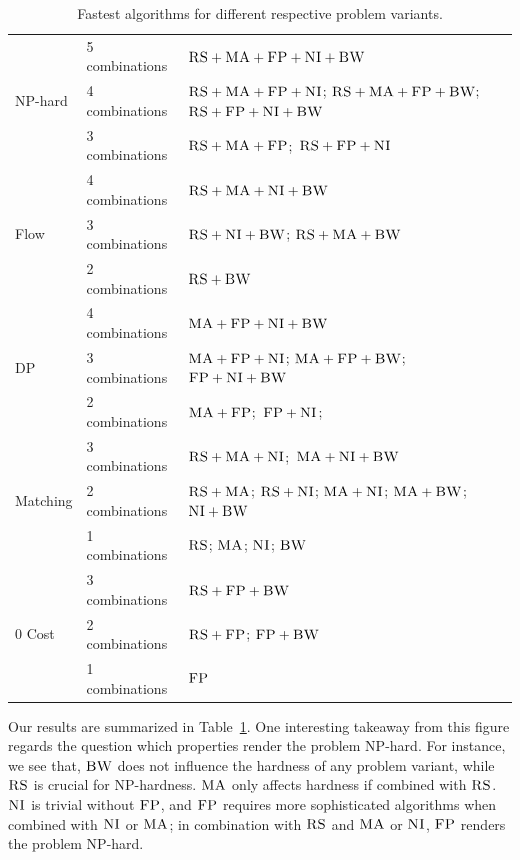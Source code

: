 \documentclass[preprint,12pt]{elsarticle}
\newcommand{\CC}{\textsc{NI}}
\newcommand{\FP}{\textsc{FP}}
\newcommand{\RS}{\textsc{RS}}
\newcommand{\BW}{\textsc{BW}}
\newcommand{\MA}{\textsc{MA}}
\begin{document}
\begin{table}
\tiny
\bgroup
\def\arraystretch{1.5}
\begin{small}
\begin{tabular}{|l|l|p{4.5cm}|}
\hline
\multirow{3}{*}{NP-hard} & 5 combinations & \mbox{$\RS+\MA+\FP+\CC+\BW$}\\
\cline{2-3}
 & 4 combinations &  \mbox{$\RS+\MA+\FP+\CC$}; \mbox{$\RS+\MA+\FP+\BW$};
\mbox{$\RS+\FP+\CC+\BW$} \\ \cline{2-3}
 & 3 combinations &\mbox{$\RS+\MA+\FP$};~\mbox{$\RS+\FP+\CC$} \\
 \hline
 \hline
\multirow{3}{*}{Flow} & 4 combinations & \mbox{$\RS+\MA+\CC+\BW$} \\ \cline{2-3}
 & 3 combinations & \mbox{$\RS+\CC+\BW$}; \mbox{$\RS+\MA+\BW$}    \\ \cline{2-3}
 & 2 combinations &$\RS+\BW$ \\
 \hline
 \hline
\multirow{3}{*}{DP} & 4 combinations & \mbox{$\MA+\FP+\CC+\BW$} \\ \cline{2-3}
 & 3 combinations &   \mbox{$\MA+\FP+\CC$};
\mbox{$\MA+\FP+\BW$}; \mbox{$\FP+\CC+\BW$} \\ \cline{2-3}
 & 2 combinations & \mbox{$\MA+\FP$};~\mbox{$\FP+\CC$}; \\
 \hline
 \hline
\multirow{3}{*}{Matching} &3 combinations&
\mbox{$\RS+\MA+\CC$};~\mbox{$\MA+\CC+\BW$}  \\
\cline{2-3}
 & 2 combinations & \mbox{$\RS+\MA$};
\mbox{$\RS+\CC$}; \mbox{$\MA+\CC$};
\mbox{$\MA+\BW$}; \mbox{$\CC+\BW$} \\ \cline{2-3}
& 1 combinations & \mbox{$\RS$}; \mbox{$\MA$};
\mbox{$\CC$}; \mbox{$\BW$}\\
 \hline
 \hline
 \multirow{3}{*}{0 Cost} & 3 combinations & \mbox{$\RS+\FP+\BW$}\\
\cline{2-3}
 & 2 combinations & \mbox{$\RS+\FP$}; \mbox{$\FP+\BW$}\\ \cline{2-3}
 & 1 combinations & \mbox{$\FP$}\\
 \hline
\end{tabular}
\end{small}
\caption{
Fastest algorithms for different respective problem variants.
}
\vspace{-2em}
\label{tab:summary}
\egroup
\end{table}


Our results are summarized in
Table~\ref{tab:summary}.
One interesting takeaway from this figure regards
the question which properties render the problem
NP-hard. For instance, we see that, $\BW$
does not influence the hardness of any problem variant,
while $\RS$ is crucial for NP-hardness.
$\MA$ only affects hardness if combined with $\RS$.
$\CC$ is trivial without $\FP$, and $\FP$ requires
more sophisticated algorithms when combined with $\CC$ or $\MA$;
in combination with $\RS$ and $\MA$ or $\CC$, $\FP$ renders the
problem NP-hard.
\end{document}
